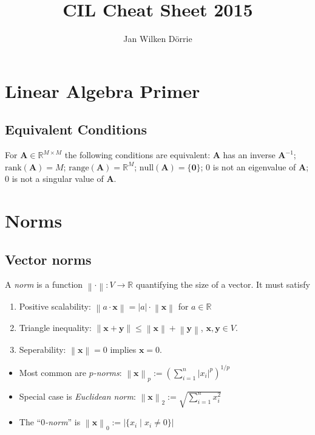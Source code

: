 \documentclass[11pt,a4paper,technote]{IEEEtran}
\newcommand{\card}[1]{\left\lvert#1\right\rvert}
\newcommand{\abs}[1]{\left\lvert#1\right\rvert}
\newcommand{\norm}[1]{\left\lVert#1\right\rVert}
\newcommand{\matr}[1]{\boldsymbol{\mathbf{#1}}}
\newcommand{\vect}[1]{\boldsymbol{\mathbf{#1}}}
\newcommand{\R}{\mathbb{R}}
\begin{document}
\title{CIL Cheat Sheet 2015}
\author{Jan Wilken D\"orrie}
\maketitle

\vspace{-2em}
\section*{Linear Algebra Primer}
\subsection*{Equivalent Conditions}
For $\matr{A} \in \R^{M \times M}$ the following conditions
are equivalent:
   $\matr{A}$ has an inverse $\matr{A}^{-1}$;
   $\mathrm{rank}(\matr{A}) = M$;
   $\mathrm{range}(\matr{A}) = \R^M$;
   $\mathrm{null}(\matr{A}) = \{\vect{0}\}$;
   $0$ is not an eigenvalue of $\matr{A}$;
   $0$ is not a singular value of $\matr{A}$.


\section*{Norms}
\subsection*{Vector norms}
A \emph{norm} is a function $\norm{\cdot} : V \to \R$ quantifying the
size of a vector. It must satisfy
\begin{enumerate}
  \item Positive scalability: $\norm{a \cdot \vect{x}} = \abs{a} \cdot
    \norm{\vect{x}}$ for $a \in \R$
  \item Triangle inequality: $\norm{\vect{x} + \vect{y}} \leq
    \norm{\vect{x}} + \norm{\vect{y}}$, $\vect{x}, \vect{y} \in V$.
  \item Seperability: $\norm{\vect{x}} = 0$ implies $\vect{x} = 0$.
\end{enumerate}

\begin{itemize}
  \item Most common are \emph{$p$-norms}:
    \(
      \norm{\vect{x}}_p := {\left(\sum_{i=1}^n \abs{x_i}^p \right)}^{1/p}
    \)
  \item Special case is \emph{Euclidean norm}:
    \( \norm{\vect{x}}_2 := \sqrt{\sum_{i=1}^n x_i^2} \)
  \item The ``\emph{$0$-norm}'' is \( \norm{\vect{x}}_0 := \card{\{x_i \mid x_i
        \neq 0\}} \)
\end{itemize}
\end{document}
